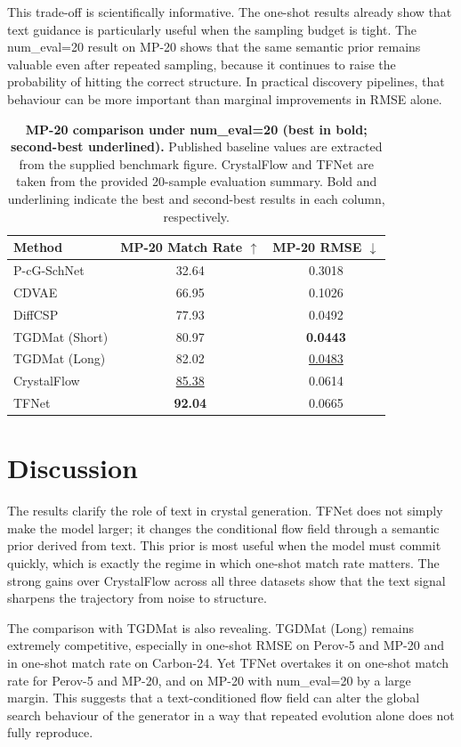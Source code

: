 \documentclass[fleqn,10pt]{wlscirep}
\begin{document}
This trade-off is scientifically informative. The one-shot results already show that text guidance is particularly useful when the sampling budget is tight. The num\_eval=20 result on MP-20 shows that the same semantic prior remains valuable even after repeated sampling, because it continues to raise the probability of hitting the correct structure. In practical discovery pipelines, that behaviour can be more important than marginal improvements in RMSE alone.

\begin{table}[ht]
\centering
\small
\setlength{\tabcolsep}{6pt}
\begin{tabular}{lcc}
\toprule
Method & MP-20 Match Rate $\uparrow$ & MP-20 RMSE $\downarrow$ \\
\midrule
P-cG-SchNet    & 32.64 & 0.3018 \\
CDVAE          & 66.95 & 0.1026 \\
DiffCSP        & 77.93 & 0.0492 \\
TGDMat (Short) & 80.97 & \textbf{0.0443} \\
TGDMat (Long)  & 82.02 & \underline{0.0483} \\
CrystalFlow    & \underline{85.38} & 0.0614 \\
TFNet      & \textbf{92.04} & 0.0665 \\
\bottomrule
\end{tabular}
\caption{\textbf{MP-20 comparison under num\_eval=20 (best in bold; second-best underlined).} Published baseline values are extracted from the supplied benchmark figure. CrystalFlow and TFNet are taken from the provided 20-sample evaluation summary. Bold and underlining indicate the best and second-best results in each column, respectively.}
\label{tab:mp20-evo20}
\end{table}

\section*{Discussion}
The results clarify the role of text in crystal generation. TFNet does not simply make the model larger; it changes the conditional flow field through a semantic prior derived from text. This prior is most useful when the model must commit quickly, which is exactly the regime in which one-shot match rate matters. The strong gains over CrystalFlow across all three datasets show that the text signal sharpens the trajectory from noise to structure.

The comparison with TGDMat is also revealing. TGDMat (Long) remains extremely competitive, especially in one-shot RMSE on Perov-5 and MP-20 and in one-shot match rate on Carbon-24. Yet TFNet overtakes it on one-shot match rate for Perov-5 and MP-20, and on MP-20 with num\_eval=20 by a large margin. This suggests that a text-conditioned flow field can alter the global search behaviour of the generator in a way that repeated evolution alone does not fully reproduce.
\end{document}
